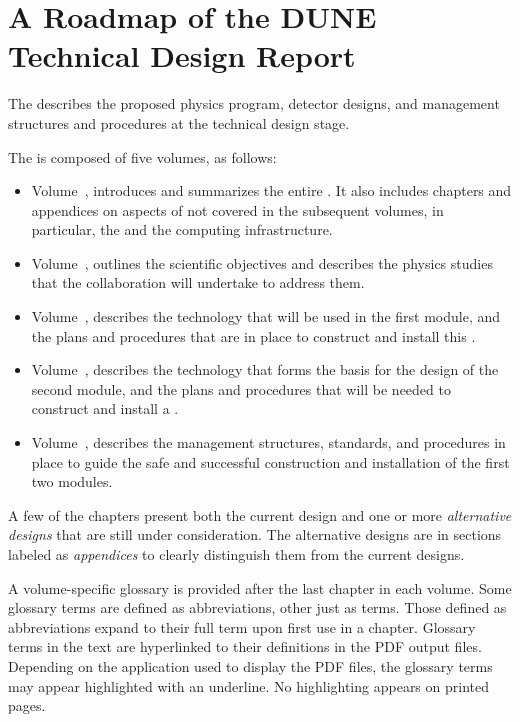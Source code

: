 \chapter*{A Roadmap of the DUNE Technical Design Report}

The   describes the proposed physics program,  
detector designs, and management structures and procedures at the technical design stage.  

The  is composed of five volumes, as follows:

\begin{itemize}
\item Volume~\volnumberexec{}, \voltitleexec{} introduces and summarizes the entire . It also includes chapters and appendices on aspects of  not covered in the subsequent volumes, in particular, the  and the computing infrastructure.

\item Volume~\volnumberphysics{}, \voltitlephysics{} outlines the scientific objectives and describes the physics studies that  the  collaboration will undertake to address them.

\item Volume~\volnumbersp{}, \voltitlesp{} describes the  technology that will be used in the first  module, and the plans and procedures that are in place to construct and install  this .

\item Volume~\volnumberdp{}, \voltitledp{} describes the  technology that forms the basis for the design of the second  module, and the plans and procedures that will be needed to construct and install a . 

\item Volume~\volnumbertc{}, \voltitletc{} describes the management structures, standards, and procedures in place to guide the safe and successful construction and installation of the first two  modules.
\end{itemize}

A few of the chapters present both the current design and one or more \textit{alternative designs} that are still under consideration. The alternative designs are in sections labeled as \textit{appendices} to clearly distinguish them from the current designs. 

A volume-specific glossary is provided after the last chapter in each volume.  Some glossary terms are defined as abbreviations, other just as terms. Those defined as abbreviations expand to their full term upon first use in a chapter. Glossary terms in the text are hyperlinked  to their definitions in the PDF output files. 
Depending on the application used to display the PDF files, the glossary terms may appear highlighted with an underline.  No highlighting appears on printed pages.



